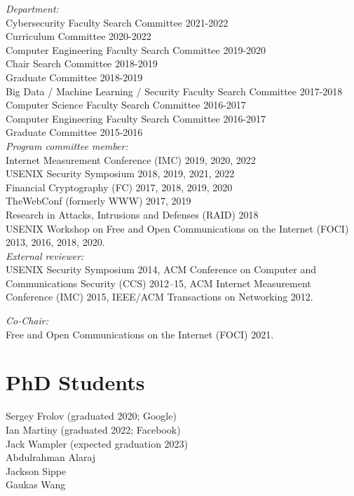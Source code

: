 \documentclass[margin,11pt]{res} %
\begin{document}
    \emph{Department:}\\
        Cybersecurity Faculty Search Committee 2021-2022 \\
        Curriculum Committee 2020-2022 \\
        Computer Engineering Faculty Search Committee 2019-2020 \\
        Chair Search Committee 2018-2019 \\
        Graduate Committee 2018-2019 \\
        Big Data / Machine Learning / Security Faculty Search Committee 2017-2018 \\
        Computer Science Faculty Search Committee 2016-2017 \\
        Computer Engineering Faculty Search Committee 2016-2017 \\
        Graduate Committee 2015-2016 \\

     \emph{Program committee member:}\\
            Internet Measurement Conference (IMC) 2019, 2020, 2022  \\
            USENIX Security Symposium 2018, 2019, 2021, 2022    \\
            Financial Cryptography (FC) 2017, 2018, 2019, 2020 \\
            TheWebConf (formerly WWW) 2017, 2019 \\
            Research in Attacks, Intrusions and Defenses (RAID) 2018 \\
            USENIX Workshop on Free and Open Communications on the Internet (FOCI) 2013, 2016, 2018, 2020. \\

    \emph{External reviewer:}\\
    USENIX Security Symposium 2014,
    ACM Conference on Computer and Communications Security (CCS) 2012--15,
    ACM Internet Measurement Conference (IMC) 2015,
    IEEE/ACM Transactions on Networking 2012.

    \emph{Co-Chair:}\\
    Free and Open Communications on the Internet (FOCI) 2021.

\vspace{6pt}
\section{\large PhD Students}
    Sergey Frolov (graduated 2020; Google) \\
    Ian Martiny (graduated 2022; Facebook) \\
    Jack Wampler (expected graduation 2023) \\ %
    Abdulrahman Alaraj \\   %
    Jackson Sippe \\ %
    Gaukas Wang \\ %
\end{document}
